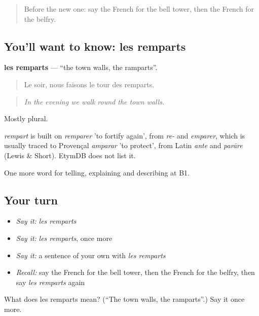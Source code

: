 \label{lesson:FR-C439-remparts}



\begin{quote}
Before the new one: say the French for the bell tower, then the French for the belfry.
\end{quote}

\subsection*{You'll want to know: les remparts}
\textbf{les remparts} — \textquotedblleft{}the town walls, the ramparts\textquotedblright{}.

\begin{quote}
Le soir, nous faisons le tour des remparts.
\end{quote}

\begin{quote}
\emph{In the evening we walk round the town walls.}
\end{quote}

Mostly plural.

\begin{cousinweb}
\emph{rempart} is built on \emph{remparer} 'to fortify again', from \emph{re-} and \emph{emparer}, which is usually traced to Provençal \emph{amparar} 'to protect', from Latin \emph{ante} and \emph{parāre} (Lewis \& Short). EtymDB does not list it.
\end{cousinweb}

\begin{grammarlens}[title={What you've built}]
One more word for telling, explaining and describing at B1.
\end{grammarlens}

\subsection*{Your turn}
\begin{itemize}
\raggedright
  \item \emph{Say it:} \emph{les remparts}
  \item \emph{Say it:} \emph{les remparts}, once more
  \item \emph{Say it:} a sentence of your own with \emph{les remparts}
  \item \emph{Recall:} say the French for the bell tower, then the French for the belfry, then say \emph{les remparts} again
\end{itemize}

\begin{tcolorbox}[breakable,colback=teal!4,colframe=teal!35!black,title={Before you move on}]
What does les remparts mean? (\textquotedblleft{}The town walls, the ramparts\textquotedblright{}.) Say it once more.
\end{tcolorbox}
